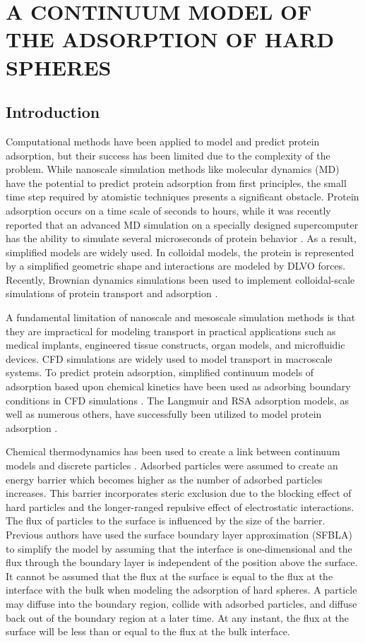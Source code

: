 
\chapter{A CONTINUUM MODEL OF THE ADSORPTION OF HARD SPHERES}


\section{Introduction}

Computational methods have been applied to model and predict protein
adsorption, but their success has been limited due to the complexity
of the problem. While nanoscale simulation methods like molecular
dynamics (MD) have the potential to predict protein adsorption from
first principles, the small time step required by atomistic techniques
presents a significant obstacle. Protein adsorption occurs on a time
scale of seconds to hours, while it was recently reported that an
advanced MD simulation on a specially designed supercomputer has the
ability to simulate several microseconds of protein behavior \cite{Dror2010}.
As a result, simplified models are widely used. In colloidal models,
the protein is represented by a simplified geometric shape and interactions
are modeled by DLVO forces. Recently, Brownian dynamics simulations
been used to implement colloidal-scale simulations of protein transport
and adsorption \cite{Unni2005,Magan2006,Quinn2008}. 

A fundamental limitation of nanoscale and mesoscale simulation methods
is that they are impractical for modeling transport in practical applications
such as medical implants, engineered tissue constructs, organ models,
and microfluidic devices. CFD simulations are widely used to model
transport in macroscale systems. To predict protein adsorption, simplified
continuum models of adsorption based upon chemical kinetics have been
used as adsorbing boundary conditions in CFD simulations \cite{Glaser1993}.
The Langmuir and RSA adsorption models, as well as numerous others,
have successfully been utilized to model protein adsorption \cite{Rabe2010}. 

Chemical thermodynamics has been used to create a link between continuum
models and discrete particles \cite{Adamczyk1999a}. Adsorbed particles
were assumed to create an energy barrier which becomes higher as the
number of adsorbed particles increases. This barrier incorporates
steric exclusion due to the blocking effect of hard particles and
the longer-ranged repulsive effect of electrostatic interactions.
The flux of particles to the surface is influenced by the size of
the barrier. Previous authors have used the surface boundary layer
approximation (SFBLA) to simplify the model by assuming that the interface
is one-dimensional and the flux through the boundary layer is independent
of the position above the surface. It cannot be assumed that the flux
at the surface is equal to the flux at the interface with the bulk
when modeling the adsorption of hard spheres. A particle may diffuse
into the boundary region, collide with adsorbed particles, and diffuse
back out of the boundary region at a later time. At any instant, the
flux at the surface will be less than or equal to the flux at the
bulk interface.

